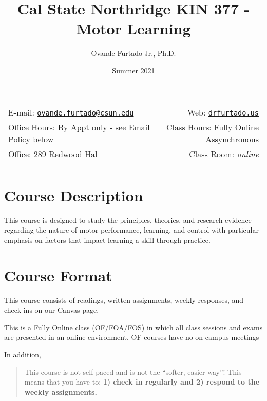 \documentclass[11pt,]{article}
\title{Cal State Northridge \textbar{} KIN 377 - Motor Learning}
\author{Ovande Furtado Jr., Ph.D.}
\date{Summer 2021}
\begin{document}
  

		\maketitle
		
	
		\thispagestyle{firststyle}



	\noindent \begin{tabular*}{\textwidth}{ @{\extracolsep{\fill}} lr @{\extracolsep{\fill}}}


E-mail: \texttt{\href{mailto:ovande.furtado@csun.edu}{\nolinkurl{ovande.furtado@csun.edu}}} & Web: \href{http://drfurtado.us}{\tt drfurtado.us}\\
Office Hours: By Appt only - \protect\hyperlink{email-policy}{see Email
Policy below}  &  Class Hours: Fully Online Assynchronous\\
Office: 289 Redwood Hal  & Class Room: \emph{online}\\
	&  \\
	\hline
	\end{tabular*}
	
\vspace{2mm}
	


\hypertarget{course-description}{%
\section{Course Description}\label{course-description}}

This course is designed to study the principles, theories, and research
evidence regarding the nature of motor performance, learning, and
control with particular emphasis on factors that impact learning a skill
through practice.

\hypertarget{course-format}{%
\section{Course Format}\label{course-format}}

This course consists of readings, written assignments, weekly responses,
and check-ins on our Canvas page.

This is a Fully Online class (OF/FOA/FOS) in which all class sessions
and exams are presented in an online environment. OF courses have no
on-campus meetings

In addition,

\begin{quote}
This course is not self-paced and is not the ``softer, easier way''!
This means that you have to: \textbf{1) check in regularly and 2)
respond to the weekly assignments.}
\end{quote}
\end{document}
